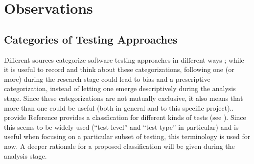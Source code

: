 \section{Observations}
\label{observ}

\subsection{Categories of Testing Approaches}
\label{categories-observ}

\ifnotpaper
      \begin{landscape}
            \ieeeTestTermsTable{}
      \end{landscape}

      \begin{landscape}
            \otherTestTermsTable{}
      \end{landscape}
      \restoregeometry
\else
      \ieeeTestTermsTable{}
\fi

Different sources categorize software testing approaches in different ways%
\ifnotpaper
      ; while it is useful to record and think about these
      categorizations, following one (or more)
      during the research
      stage could lead to bias and a prescriptive categorization, instead of letting
      one emerge descriptively during the analysis stage. Since these categorizations
      are not mutually exclusive, it also means that more than one could be useful
      (both in general and to this specific project).\newline \else.\fi\
\ifnotpaper \citet{IEEE2022} provide \else Reference \cite{IEEE2022} provides
\fi a classfication for different kinds of tests (see \refIEEETestTerms{}).
\ifnotpaper\else Since
      this seems to be widely used (``test level'' and ``test type'' in particular)
      and is useful when focusing on a particular subset of testing, this terminology
      is used for now. A deeper rationale for a
      proposed classification will be given during the analysis stage. \fi

